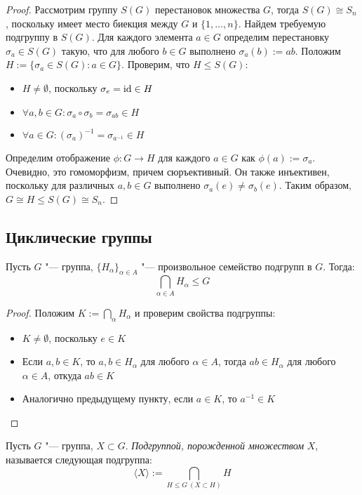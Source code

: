 \begin{proof}
	Рассмотрим группу $S(G)$ перестановок множества $G$, тогда $S(G) \cong S_n$, поскольку имеет место биекция между $G$ и $\{1, \dots, n\}$. Найдем требуемую подгруппу в $S(G)$. Для каждого элемента $a \in G$ определим перестановку $\sigma_a \in S(G)$ такую, что для любого $b \in G$ выполнено $\sigma_a(b) := ab$. Положим $H := \{\sigma_a \in S(G): a \in G\}$. Проверим, что $H \le S(G)$:
	\begin{itemize}
		\item $H \ne \emptyset$, поскольку $\sigma_e = \mathrm{id} \in H$
		\item $\forall a, b \in G: \sigma_a \circ \sigma_b = \sigma_{ab} \in H$
		\item $\forall a \in G: (\sigma_a)^{-1} = \sigma_{a^{-1}} \in H$
	\end{itemize}
	
	Определим отображение $\phi: G \rightarrow H$ для каждого $a \in G$ как $\phi(a) := \sigma_a$. Очевидно, это гомоморфизм, причем сюръективный. Он также инъективен, поскольку для различных $a, b \in G$ выполнено $\sigma_a(e) \ne \sigma_b(e)$. Таким образом, $G \cong H \le S(G) \cong S_n$.
\end{proof}

\subsection{Циклические группы}

\begin{proposition}
	Пусть $G$ "--- группа, $\{H_\alpha\}_{\alpha \in A}$ "--- произвольное семейство подгрупп в $G$. Тогда:
	\[\bigcap_{\alpha \in A} H_\alpha \le G\]
\end{proposition}

\begin{proof}
	Положим $K := \bigcap_{\alpha} H_\alpha$ и проверим свойства подгруппы:
	\begin{itemize}
		\item $K \ne \emptyset$, поскольку $e \in K$
		\item Если $a, b \in K$, то $a, b \in H_\alpha$ для любого $\alpha \in A$, тогда $ab \in H_\alpha$ для любого $\alpha \in A$, откуда $ab \in K$
		\item Аналогично предыдущему пункту, если $a\in K$, то $a^{-1}\in K$\qedhere
	\end{itemize}
\end{proof}

\begin{definition}
	Пусть $G$ "--- группа, $X \subset G$. \textit{Подгруппой, порожденной множеством} $X$, называется следующая подгруппа:
	\[\langle X\rangle := \bigcap_{H \le G~(X \subset H)}H\]
\end{definition}

